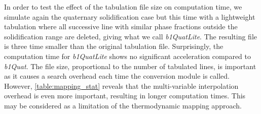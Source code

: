 In order to test the effect of the tabulation file size on computation time, we simulate again the quaternary solidification case but this time with a lightweight
tabulation where all successive line with similar phase fractions outside the solidification range are deleted, giving what we call \emph{b1QuatLite}. The 
resulting file is three time smaller than the original tabulation file. Surprisingly, the computation time for \emph{b1QuatLite} shows no significant acceleration 
compared to \emph{b1Quat}. The file size, proportional to the number of tabulated lines, is important as it causes a search overhead each time the conversion module
is called. However, \cref{table:mapping_stat} reveals that the multi-variable interpolation overhead is even more important, resulting in longer computation times.
This may be considered as a limitation of the thermodynamic mapping approach.

